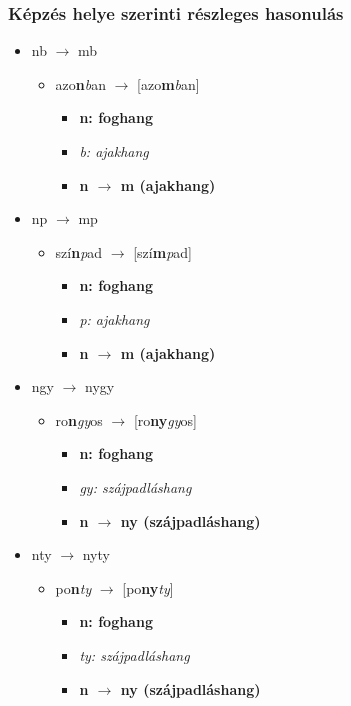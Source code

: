 \documentclass{article}
\begin{document}
\subsubsection{Képzés helye szerinti részleges hasonulás}

\begin{itemize}
    \item nb $\rightarrow$ mb\begin{itemize}
        \item azo\textbf{n}\textit{b}an $\rightarrow$ [azo\textbf{m}\textit{b}an] \begin{itemize}
            \item \textbf{n: foghang}
            \item \textit{b: ajakhang}
            \item \textbf{n $\rightarrow$ m (ajakhang)}
        \end{itemize}
    \end{itemize}
    \item np $\rightarrow$ mp \begin{itemize}
        \item szí\textbf{n}\textit{p}ad $\rightarrow$ [szí\textbf{m}\textit{p}ad] \begin{itemize}
            \item \textbf{n: foghang}
            \item \textit{p: ajakhang}
            \item \textbf{n $\rightarrow$ m (ajakhang)}
        \end{itemize}
    \end{itemize}
    \item ngy $\rightarrow$ nygy \begin{itemize}
        \item ro\textbf{n}\textit{gy}os $\rightarrow$ [ro\textbf{ny}\textit{gy}os] \begin{itemize}
            \item \textbf{n: foghang}
            \item \textit{gy: szájpadláshang}
            \item \textbf{n $\rightarrow$ ny (szájpadláshang)}
        \end{itemize}
    \end{itemize}
    \item nty $\rightarrow$ nyty \begin{itemize}
        \item po\textbf{n}\textit{ty} $\rightarrow$ [po\textbf{ny}\textit{ty}] \begin{itemize}
            \item \textbf{n: foghang}
            \item \textit{ty: szájpadláshang}
            \item \textbf{n $\rightarrow$ ny (szájpadláshang)}
        \end{itemize}
    \end{itemize}
\end{itemize}
\end{document}
